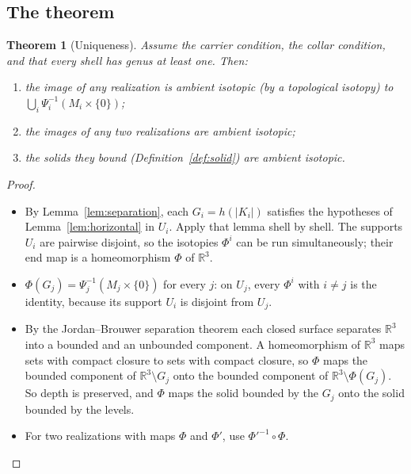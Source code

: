 \documentclass[preprint,12pt]{elsarticle}
\newtheorem{theorem}{Theorem}[section]
\theoremstyle{definition}
\theoremstyle{remark}
\newcommand{\R}{\mathbb{R}}
\begin{document}
\subsection{The theorem}

\begin{theorem}[Uniqueness]\label{thm:uniqueness}
Assume the carrier condition, the collar condition, and that every shell has genus at least one. Then:
\begin{enumerate}
\item the image of any realization is ambient isotopic (by a topological isotopy) to
$\bigcup_i\Psi_i^{-1}(M_i\times\{0\})$;
\item the images of any two realizations are ambient isotopic;
\item the solids they bound (Definition~\ref{def:solid}) are ambient isotopic.
\end{enumerate}
\end{theorem}
\begin{proof}
\begin{itemize}
\item By Lemma~\ref{lem:separation}, each $G_i=h(|K_i|)$ satisfies the hypotheses of Lemma~\ref{lem:horizontal} in
$U_i$. Apply that lemma shell by shell. The supports $U_i$ are pairwise disjoint, so the isotopies $\Phi^i$ can be
run simultaneously; their end map is a homeomorphism $\Phi$ of $\R^3$.
\item $\Phi(G_j)=\Psi_j^{-1}(M_j\times\{0\})$ for every $j$: on $U_j$, every $\Phi^i$ with $i\ne j$ is the identity,
because its support $U_i$ is disjoint from $U_j$.
\item By the Jordan--Brouwer separation theorem each closed surface separates $\R^3$ into a bounded and an unbounded
component. A homeomorphism of $\R^3$ maps sets with compact closure to sets with compact closure, so $\Phi$ maps the
bounded component of $\R^3\setminus G_j$ onto the bounded component of $\R^3\setminus\Phi(G_j)$. So depth is
preserved, and $\Phi$ maps the solid bounded by the $G_j$ onto the solid bounded by the levels.
\item For two realizations with maps $\Phi$ and $\Phi'$, use $\Phi'^{-1}\circ\Phi$.
\end{itemize}
\end{proof}
\end{document}
